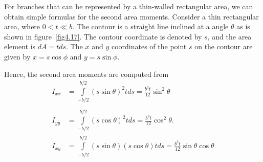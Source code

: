 \documentclass{AeroStructure-ERJohnson}
\begin{document}
For branches that can be represented by a thin-walled rectangular area, we can obtain simple formulas for the second area moments. Consider a thin rectangular area, where $0<t \ll b$. The contour is a straight line inclined at a angle $\theta$ as is shown in figure~\ref{fig4.17}. The contour coordinate is denoted by $s$, and the area element is $d A=t d s$. The $x$ and $y$ coordinates of the point $s$ on the contour are given by $x=s \cos \phi$ and $y=s \sin \phi$.

{\def\thefigure{4.17}
}

Hence, the second area moments are computed from
\begin{align}
I_{x x}&=\int\limits^{b/2}_{-b/2}(s \sin \theta)^{2} t d s=\frac{b^{3} t}{12} \sin ^{2} \theta \nonumber\\
\nonumber\\
I_{y y} &=\int\limits^{b/2}_{-b/2}(s \cos \theta)^{2} t d s=\frac{b^{3} t}{12} \cos ^{2} \theta. \label{eq4.47}\\
I_{x y} &=\int\limits^{b/2}_{-b/2}(s \sin \theta)(s \cos \theta) t d s=\frac{b^{3} t}{12} \sin \theta \cos \theta\nonumber
\end{align}

\vspace*{-1\baselineskip}
\end{document}
